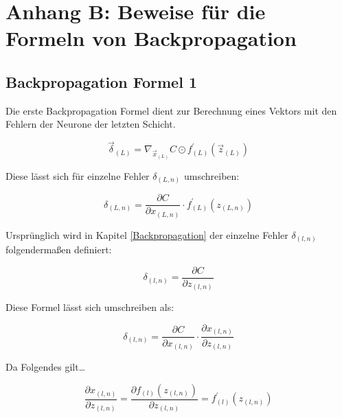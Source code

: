 \documentclass[
	a4paper,
	12pt,
	ngerman,
	oneside
]{scrreprt}											%
\begin{document}
	
	
		\newpage
		\vspace*{2cm}			
		\section*{Anhang B: Beweise für die Formeln von Backpropagation}
			
			\subsection*{Backpropagation Formel 1}
				Die erste Backpropagation Formel dient zur Berechnung eines Vektors mit den Fehlern der Neurone der letzten Schicht.

				\begin{equation}
					\vec{\delta}_{(L)} = \nabla_{\vec{x}_{(L)}}C \odot f_{(L)}^{\prime} (\vec{z}_{(L)})
				\end{equation}
				
				Diese lässt sich für einzelne Fehler $\delta_{(L,n)}$ umschreiben:
				
				\begin{equation}\label{Beweis1Formel2}
					\delta_{(L,n)} = \frac{\partial C}{\partial x_{(L,n)}} \cdot f_{(L)}^{\prime} (z_{(L,n)})
				\end{equation}
				
				Ursprünglich wird in Kapitel \ref{Backpropagation} der einzelne Fehler $\delta_{(l,n)}$ folgendermaßen definiert:
				
				\begin{equation}
					\delta_{(l,n)} = \frac{\partial C}{\partial z_{(l,n)}}
				\end{equation}
				
				Diese Formel lässt sich umschreiben als:
				
				\begin{equation}\label{Beweis1Formel1}
					\delta_{(l,n)} = \frac{\partial C}{\partial x_{(l,n)}} \cdot \frac{\partial x_{(l,n)}}{\partial z_{(l,n)}}
				\end{equation}
				
				Da Folgendes gilt…
				
				\begin{equation}
					\frac{\partial x_{(l,n)}}{\partial z_{(l,n)}} = \frac{\partial f_{(l)}(z_{(l,n)})}{\partial z_{(l,n)}} = f_{(l)}^{\prime} (z_{(l,n)})
				\end{equation}			
				
\end{document}
